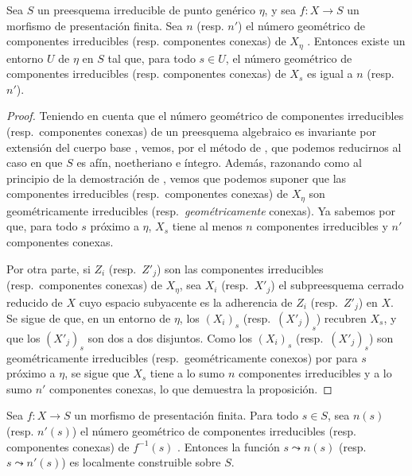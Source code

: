 \begin{proposition}[9.7.8]
\label{IV.9.7.8}
Sea $S$ un preesquema irreducible de punto genérico $\eta$, y sea $f:X\to S$ un morfismo de presentación finita. Sea $n$ \textup{(resp.} $n'$\textup{)} el número geométrico de componentes irreducibles \textup{(resp.} componentes conexas\textup{)} de $X_\eta$ . Entonces existe un entorno $U$ de $\eta$ en $S$ tal que, para todo $s\in U$, el número geométrico de componentes irreducibles \textup{(resp.} componentes conexas\textup{)} de $X_s$ es igual a $n$ \textup{(resp.} $n'$\textup{)}.
\end{proposition}

\begin{proof}
Teniendo en cuenta que el número geométrico de componentes irreducibles (resp.\ componentes conexas) de un preesquema algebraico es invariante por extensión del cuerpo base , vemos, por el método de , que podemos reducirnos al caso en que $S$ es afín, noetheriano e íntegro. Además, razonando como al principio de la demostración de , vemos que podemos suponer que las componentes irreducibles (resp.\ componentes conexas) de $X_\eta$ son geométricamente irreducibles (resp.\ \emph{geométricamente} conexas). Ya sabemos por  que, para todo $s$ próximo a $\eta$, $X_s$ tiene al menos $n$ componentes irreducibles y $n'$ componentes conexas.

Por otra parte, si $Z_i$ (resp.\ $Z'_j$) son las componentes irreducibles (resp.\ componentes conexas) de $X_\eta$, sea $X_i$ (resp.\ $X'_j$) el subpreesquema cerrado reducido de $X$ cuyo espacio subyacente es la adherencia de $Z_i$ (resp.\ $Z'_j$) en $X$. Se sigue de  que, en un entorno de $\eta$, los $(X_i)_s$ (resp.\ $(X'_j)_s$) recubren $X_s$, y que los $(X'_j)_s$ son dos a dos disjuntos. Como los $(X_i)_s$ (resp.\ $(X'_j)_s$) son geométricamente irreducibles (resp.\ geométricamente conexos) por  para $s$ próximo a $\eta$, se sigue que $X_s$ tiene a lo sumo $n$ componentes irreducibles y a lo sumo $n'$ componentes conexas, lo que demuestra la proposición.
\end{proof}

\begin{corollary}[9.7.9]
\label{IV.9.7.9}
Sea $f:X\to S$ un morfismo de presentación finita. Para todo $s\in S$, sea $n(s)$ \textup{(resp.} $n'(s)$\textup{)} el número geométrico de componentes irreducibles \textup{(resp.} componentes conexas\textup{)} de $f^{-1}(s)$ . Entonces la función $s\leadsto n(s)$ \textup{(resp.} $s\leadsto n'(s)$\textup{)} es localmente construible sobre $S$.
\end{corollary}

